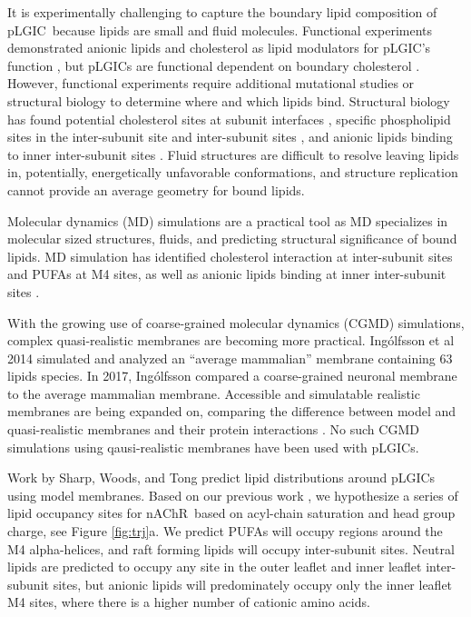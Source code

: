 \documentclass[preprint,3p,9pt,times,onecolumn]{elsarticle}
\newcommand{\nachr}{nAChR}
\newcommand{\plgic}{pLGIC}
\begin{document}
It is experimentally challenging to capture the boundary lipid composition of \plgic~because lipids are small and fluid molecules. Functional experiments demonstrated anionic lipids and cholesterol as lipid modulators for \plgic's function  \cite{Ellena1983,Fong1986,Fong1987,Jones1988,Sunshine1994,DaCosta2009b}, but \plgic s are functional dependent on boundary cholesterol \cite{Dalziel1980,Addona1998,M.CriadoH.Eibl1982}. However, functional experiments require additional mutational studies or structural biology to determine where and which lipids bind. Structural biology has found potential cholesterol sites at subunit interfaces \cite{Laverty2017, Budelier2019}, specific phospholipid sites in the inter-subunit site \cite{Henault2019,Basak2017} and inter-subunit sites \cite{Kim2020}, and anionic lipids binding to inner inter-subunit sites \cite{Tong2019}. Fluid structures are difficult to resolve leaving lipids in, potentially, energetically unfavorable conformations, and structure replication cannot provide an average geometry for bound lipids.

Molecular dynamics (MD) simulations are a practical tool as MD specializes in molecular sized structures, fluids, and predicting structural significance of bound lipids. MD simulation has identified cholesterol \cite{Brannigan2008} interaction at inter-subunit sites and PUFAs at M4 sites\cite{Woods2019}, as well as anionic lipids binding at inner inter-subunit sites \cite{Tong2019}. 

With the growing use of coarse-grained molecular dynamics (CGMD) simulations, complex quasi-realistic membranes are becoming more practical. Ing{\'o}lfsson et al 2014 simulated and analyzed an ``average mammalian'' membrane containing 63 lipids species. In 2017, Ing{\'o}lfsson compared a coarse-grained neuronal membrane\cite{Ingolfsson2017b} to the average mammalian membrane. Accessible and simulatable realistic membranes are being expanded on, comparing the difference between model and quasi-realistic membranes and their protein interactions \cite{Marrink2019,Wilson2020,Ingolfsson2020,Carpenter2018,Lorent2019}. No such CGMD simulations using qausi-realistic membranes have been used with \plgic s.

Work by Sharp\cite{Sharp2019}, Woods\cite{Woods2019}, and Tong\cite{Tong2019} predict lipid distributions around \plgic s using model membranes. Based on our previous work \cite{Sharp2019, Woods2019, Tong2019}, we hypothesize a series of lipid occupancy sites for \nachr~based on acyl-chain saturation and head group charge, see Figure \ref{fig:trj}a. We predict PUFAs will occupy regions around the M4 alpha-helices, and raft forming lipids will occupy inter-subunit sites. Neutral lipids are predicted to occupy any site in the outer leaflet and inner leaflet inter-subunit sites, but anionic lipids will predominately occupy only the inner leaflet M4 sites, where there is a higher number of cationic amino acids.
\end{document}
